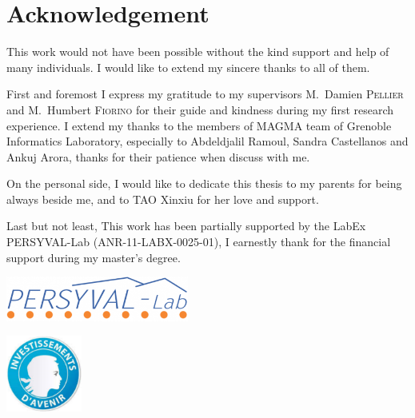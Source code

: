 \section*{Acknowledgement}
This work would not have been possible without the kind support and help of many individuals. I would like to extend my sincere thanks to all of them.

First and foremost I express my gratitude to my supervisors M.~Damien \textsc{Pellier} and M.~Humbert \textsc{Fiorino} for their guide and kindness during my first research experience. I extend my thanks to the members of MAGMA team of Grenoble Informatics Laboratory, especially to Abdeldjalil Ramoul, Sandra Castellanos and Ankuj Arora, thanks for their patience when discuss with me.

On the personal side, I would like to dedicate this thesis to my parents for being always beside me, and to TAO Xinxiu for her love and support.

Last but not least, This work has been partially supported by the LabEx PERSYVAL-Lab (ANR-11-LABX-0025-01), I earnestly thank for the financial support during my master’s degree.

\begin{minipage}[t]{0.48\textwidth} %
  \begin{flushleft}
    \includegraphics [width=60mm]{images/persyval1.png}
    \begin{spacing}{1.5}
    \end{spacing}
  \end{flushleft}
\end{minipage}
\begin{minipage}[t]{0.48\textwidth} %
  \begin{flushright}
    \includegraphics [width=25mm]{images/persyval2.png}
  \end{flushright}
\end{minipage}